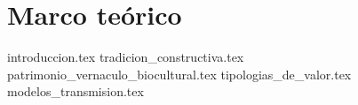 \section{Marco teórico}

{introduccion.tex}
{tradicion_constructiva.tex}
{patrimonio_vernaculo_biocultural.tex}
{tipologias_de_valor.tex}
{modelos_transmision.tex}



